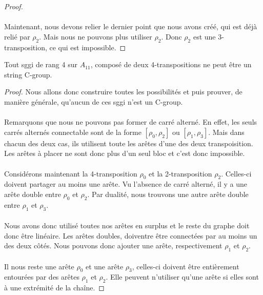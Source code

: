 \begin{proof}
  \paragraph{}
  Maintenant, nous devons relier le dernier point que nous avons créé, qui est déjà relié par $\rho_2$. Mais nous ne pouvons plus utiliser $\rho_2$. Donc $\rho_2$ est une 3-transposition, ce qui est impossible.

\end{proof}

\begin{theorem}
  Tout sggi de rang 4 sur $A_{11}$, composé de deux 4-transpositions ne peut être un string C-group.
\end{theorem}

\begin{proof}
  Nous allons donc construire toutes les possibilités et puis prouver, de manière générale, qu'aucun de ces sggi n'est un C-group.

  \paragraph{}
  Remarquons que nous ne pouvons pas former de carré alterné. En effet, les seuls carrés alternés connectable sont de la forme $[\rho_0, \rho_2]$ ou $[\rho_1, \rho_3]$. Mais dans chacun des deux cas, ils utilisent toute les arêtes d'une des deux transpoisition. Les arêtes à placer ne sont donc plus d'un seul bloc et c'est donc impossible.

  \paragraph{}
  Considérons maintenant la 4-transposition $\rho_0$ et la 2-transposition $\rho_2$. Celles-ci doivent partager au moins une arête. Vu l'absence de carré alterné, il y a une arête double entre $\rho_0$ et $\rho_2$. Par dualité, nous trouvons une autre arête double entre $\rho_1$ et $\rho_3$.

  \paragraph{}
  Nous avons donc utilisé toutes nos arêtes en surplus et le reste du graphe doit donc être linéaire. Les arêtes doubles, doiventre être connectées par au moins un des deux côtés. Nous pouvons donc ajouter une arête, respectivement $\rho_1$ et $\rho_2$.

  \paragraph{}
  Il nous reste une arête $\rho_0$ et une arête $\rho_3$, celles-ci doivent être entièrement entourées par des arêtes $\rho_1$ et $\rho_2$. Elle peuvent n'utiliser qu'une arête si elles sont à une extrémité de la chaîne.


\end{proof}
